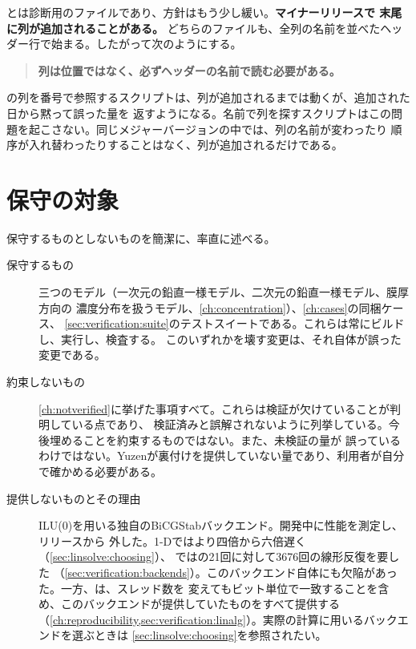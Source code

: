 とは診断用のファイルであり、方針はもう少し緩い。\textbf{マイナーリリースで
末尾に列が追加されることがある。} どちらのファイルも、全列の名前を並べたヘッダー行で始まる。したがって次のようにする。

\begin{quote}
  \textbf{列は位置ではなく、必ずヘッダーの名前で読む必要がある。}
\end{quote}

の列を番号で参照するスクリプトは、列が追加されるまでは動くが、追加された日から黙って誤った量を
返すようになる。名前で列を探すスクリプトはこの問題を起こさない。同じメジャーバージョンの中では、列の名前が変わったり
順序が入れ替わったりすることはなく、列が追加されるだけである。

\section{保守の対象}
\label{sec:policy:support}

保守するものとしないものを簡潔に、率直に述べる。

\begin{description}
  \item[保守するもの] 三つのモデル（一次元の鉛直一様モデル、二次元の鉛直一様モデル、膜厚方向の
    濃度分布を扱うモデル、\cref{ch:concentration}）、\cref{ch:cases}の同梱ケース、
    \cref{sec:verification:suite}のテストスイートである。これらは常にビルドし、実行し、検査する。
    このいずれかを壊す変更は、それ自体が誤った変更である。
  \item[約束しないもの] \cref{ch:notverified}に挙げた事項すべて。これらは検証が欠けていることが判明している点であり、
    検証済みと誤解されないように列挙している。今後埋めることを約束するものではない。また、未検証の量が
    誤っているわけではない。Yuzenが裏付けを提供していない量であり、利用者が自分で確かめる必要がある。
  \item[提供しないものとその理由] ILU(0)を用いる独自のBiCGStabバックエンド。開発中に性能を測定し、リリースから
    外した。1-Dではより四倍から六倍遅く（\cref{sec:linsolve:choosing}）、
    ではの21回に対して3676回の線形反復を要した
    （\cref{sec:verification:backends}）。このバックエンド自体にも欠陥があった。一方、は、スレッド数を
    変えてもビット単位で一致することを含め、このバックエンドが提供していたものをすべて提供する
    （\cref{ch:reproducibility,sec:verification:linalg}）。実際の計算に用いるバックエンドを選ぶときは
    \cref{sec:linsolve:choosing}を参照されたい。
\end{description}

